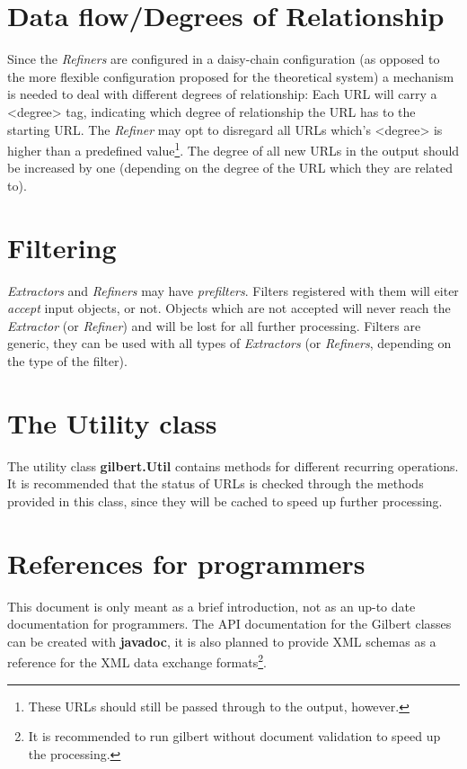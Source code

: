 \documentclass[a4paper]{danarticle}
\begin{document}
  \section*{Data flow/Degrees of Relationship}
    Since the \textit{Refiners} are configured in a daisy-chain configuration
    (as opposed to the more flexible configuration proposed for the theoretical
    system) a mechanism is needed to deal with different degrees of
    relationship: Each URL will carry a <degree> tag, indicating which degree
    of relationship the URL has to the starting URL. The \textit{Refiner}
    may opt to disregard all URLs which's <degree> is higher than a 
    predefined value\footnote{These URLs should still be passed through to
    the output, however.}. The degree of all new URLs in the output should be
    increased by one (depending on the degree of the URL which they are related
    to).
  \section*{Filtering}
    \textit{Extractors} and \textit{Refiners} may have \textit{prefilters}. 
    Filters registered with them will eiter \textit{accept} input objects, or
    not. Objects which are not accepted will never reach the \textit{Extractor}
    (or \textit{Refiner}) and will be lost for all further processing. Filters
    are generic, they can be used with all types of \textit{Extractors}  
    (or \textit{Refiners}, depending on the type of the filter).
    
  \section*{The Utility class}
    The utility class \textbf{gilbert.Util} contains methods for different
    recurring operations. It is recommended that the status of URLs is checked
    through the methods provided in this class, since they will be cached
    to speed up further processing.
    
  \section*{References for programmers}
    This document is only meant as a brief introduction, not as an up-to date
    documentation for programmers. The API documentation for the Gilbert classes 
    can be created with \textbf{javadoc}, it is also planned to provide 
    XML schemas as a reference for the XML data exchange 
    formats\footnote{It is recommended to run gilbert without document
    validation to speed up the processing.}.
\end{document}
